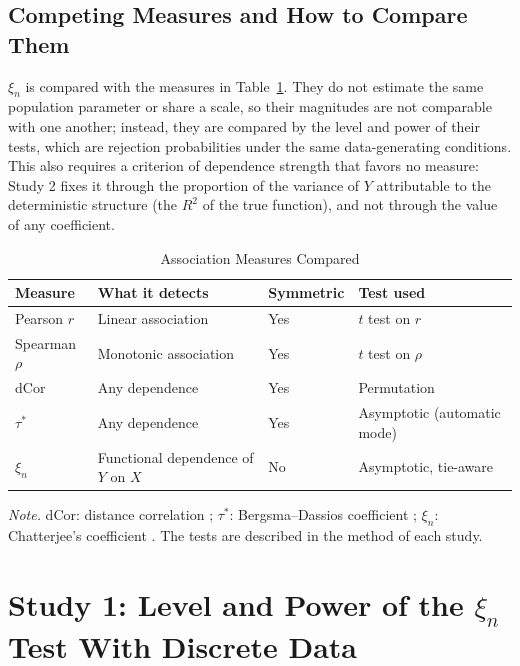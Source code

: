 \documentclass[man,mask,donotrepeattitle,floatsintext]{apa7}
\begin{document}
\subsection{Competing Measures and How to Compare Them}

$\xi_n$ is compared with the measures in Table~\ref{tab:medidas}. They do not estimate the same population parameter or share a scale, so their magnitudes are not comparable with one another; instead, they are compared by the level and power of their tests, which are rejection probabilities under the same data-generating conditions. This also requires a criterion of dependence strength that favors no measure: Study 2 fixes it through the proportion of the variance of $Y$ attributable to the deterministic structure (the $R^2$ of the true function), and not through the value of any coefficient.

\begin{table}
\caption{Association Measures Compared}
\label{tab:medidas}
\begin{threeparttable}
\small
\begin{tabular}{llll}
\toprule
Measure & What it detects & Symmetric & Test used \\
\midrule
Pearson $r$ & Linear association & Yes & $t$ test on $r$ \\
Spearman $\rho$ & Monotonic association & Yes & $t$ test on $\rho$ \\
dCor & Any dependence & Yes & Permutation \\
$\tau^*$ & Any dependence & Yes & Asymptotic (automatic mode) \\
$\xi_n$ & Functional dependence of $Y$ on $X$ & No & Asymptotic, tie-aware \\
\bottomrule
\end{tabular}
\begin{tablenotes}[flushleft]
\small
\item \textit{Note.} dCor: distance correlation \parencite{szekely2007}; $\tau^*$: Bergsma--Dassios coefficient \parencite{bergsma2014}; $\xi_n$: Chatterjee's coefficient \parencite{chatterjee2021}. The tests are described in the method of each study.
\end{tablenotes}
\end{threeparttable}
\end{table}

\section{Study 1: Level and Power of the $\xi_n$ Test With Discrete Data}
\end{document}
